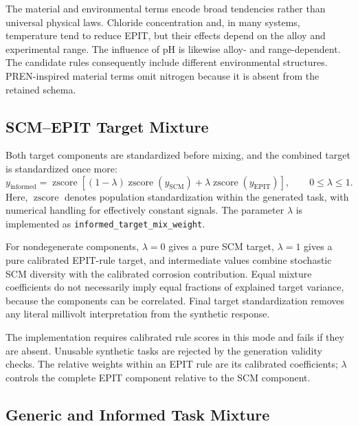 \documentclass{article}
\newcommand{\zscore}{\operatorname{zscore}}
\begin{document}
The material and environmental terms encode broad tendencies rather than
universal physical laws. Chloride concentration and, in many systems,
temperature tend to reduce EPIT, but their effects depend on the alloy and
experimental range. The influence of pH is likewise alloy- and range-dependent.
The candidate rules consequently include different environmental structures.
PREN-inspired material terms omit nitrogen because it is absent from the
retained schema.

\subsection{SCM--EPIT Target Mixture}
\label{sec:target-mixture}

Both target components are standardized before mixing, and the combined
target is standardized once more:
\begin{equation}
y_{\mathrm{informed}}
=\zscore\!\left[
 (1-\lambda)\zscore(y_{\mathrm{SCM}})
 +\lambda\zscore(y_{\mathrm{EPIT}})
\right],\qquad0\leq\lambda\leq1.
\label{eq:scm-epit-target}
\end{equation}
Here, \(\zscore\) denotes population standardization within the generated
task, with numerical handling for effectively constant signals. The parameter
\(\lambda\) is implemented as \texttt{informed\_target\_mix\_weight}.

For nondegenerate components, \(\lambda=0\) gives a pure SCM target,
\(\lambda=1\) gives a pure calibrated EPIT-rule target, and intermediate
values combine stochastic SCM diversity with the calibrated corrosion
contribution. Equal mixture coefficients do not necessarily imply equal
fractions of explained target variance, because the components can be
correlated. Final target standardization removes any literal millivolt
interpretation from the synthetic response.

The implementation requires calibrated rule scores in this mode and fails if
they are absent. Unusable synthetic tasks are rejected by the generation
validity checks. The relative weights within an EPIT rule are its calibrated
coefficients; \(\lambda\) controls the complete EPIT component relative to the
SCM component.

\subsection{Generic and Informed Task Mixture}
\end{document}
